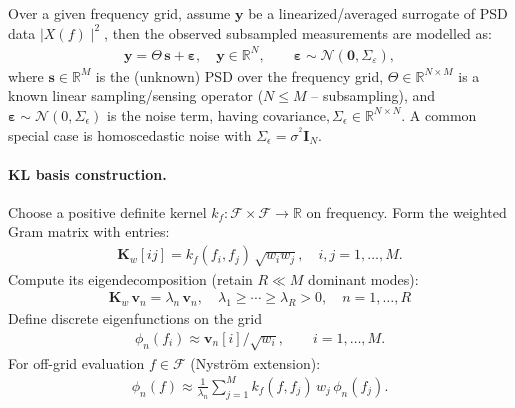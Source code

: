 \documentclass[11pt,a4paper]{report}
\theoremstyle{definition}
\providecommand{\ve}[1]{{\boldsymbol{#1}}}
\providecommand{\mat}[1]{{\pmb{#1}}}
\newcommand{\Real}{\mathbb{R}}
\begin{document}
Over a given frequency grid, assume \(\ve{y}\) be a linearized/averaged surrogate of PSD data \({\mid} X(f){\mid}^{2}\), then the observed subsampled measurements are modelled as:
\begin{align}
	\ve{y} = \boldsymbol{\varTheta}\,\ve{s} + \boldsymbol{\varepsilon}, 
	\quad 	\ve{y} \in \mathbb{R}^N, \qquad \boldsymbol{\varepsilon} \sim \mathcal{N}(\mathbf{0}, \boldsymbol{ \varSigma}_\varepsilon),
\end{align}
where $\ve{s} {\in} \mathbb{R}^{M}$ is the (unknown) PSD over the frequency grid, $\boldsymbol{\varTheta}{\in} \mathbb{R}^{N \times M}$ is a known linear sampling/sensing operator (\(N {\le} M\) -- subsampling), and $\boldsymbol{ \varepsilon}{\sim} \mathcal{N}(0,\varSigma_\epsilon)$ is the noise term, having covariance\(,\varSigma_\epsilon{\in}\Real^{N\times N}\). A common special case is homoscedastic noise with $ \varSigma_\epsilon{=}\sigma^{^2} \mat{I}_N$.

\paragraph{KL basis construction.}
Choose a positive definite kernel $k_f {:} \mathcal{F}\times \mathcal{F}{\to} \mathbb{R}$ on frequency.
Form the weighted Gram matrix with entries:
\begin{align}
	\mat{K}_w[{ij}] = k_f(f_i, f_j)\,\sqrt{w_i w_j}, \quad i,j=1,\dots,M.
\end{align}
Compute its eigendecomposition (retain $R {\ll} M$ dominant modes):
\begin{align}
	\mat{K}_w \,\ve{v}_n = \lambda_n \,\ve{v}_n,\quad\lambda_1{ \ge} \cdots {\ge} \lambda_R {>} 0, 
	\quad n=1,\dots,R
\end{align}
Define discrete eigenfunctions on the grid
\begin{align}
	\phi_n(f_i) \approx {\ve{v}_n[i]}/{\sqrt{w_i}}, 
	\qquad i=1,\dots,M.
\end{align}
For off-grid evaluation $f{\in} \mathcal{F}$ (Nyström extension):
\begin{align}
	\phi_n(f) \approx \frac{1}{\lambda_n} \sum_{j=1}^{M} k_f(f, f_j)\, w_j\, \phi_n(f_j).
\end{align}
\end{document}
